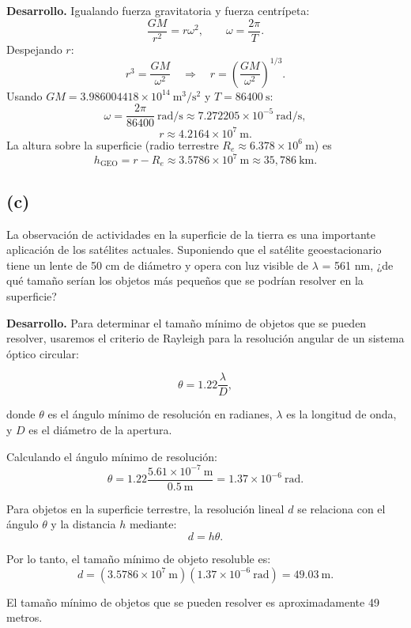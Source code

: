 \documentclass[11pt]{article}
\begin{document}
\vspace{0.5em}
\noindent\textbf{Desarrollo.} Igualando fuerza gravitatoria y fuerza centrípeta:
\[
\frac{GM}{r^2} = r\omega^2,\qquad \omega = \frac{2\pi}{T}.
\]
Despejando \(r\):
\[
r^3 = \frac{GM}{\omega^2} \quad\Rightarrow\quad r = \left(\frac{GM}{\omega^2}\right)^{1/3}.
\]
Usando \(GM = 3.986004418\times 10^{14}\ \mathrm{m^3/s^2}\) y \(T=86400\ \mathrm{s}\):
\[
\omega = \frac{2\pi}{86400}\ \mathrm{rad/s}\approx 7.272205\times 10^{-5}\ \mathrm{rad/s},
\]
\[
r \approx 4.2164\times 10^{7}\ \mathrm{m}.
\]
La altura sobre la superficie (radio terrestre \(R_e\approx 6.378\times 10^{6}\ \mathrm{m}\)) es
\[
\boxed{h_{\text{GEO}} = r - R_e \approx 3.5786\times 10^{7}\ \mathrm{m} \approx 35{,}786\ \mathrm{km}.}
\]

\subsection*{(c)}
La observación de actividades en la superficie de la tierra es una importante aplicación de los satélites actuales. Suponiendo que el satélite geoestacionario tiene un lente de 50 cm de diámetro y opera con luz visible de $\lambda$ = 561 nm, ¿de qué tamaño serían los objetos más pequeños que se podrían resolver en la superficie?

\vspace{0.5em}
\noindent\textbf{Desarrollo.}
Para determinar el tamaño mínimo de objetos que se pueden resolver, usaremos el criterio de Rayleigh para la resolución angular de un sistema óptico circular:

\[
\theta = 1.22 \frac{\lambda}{D},
\]

donde \(\theta\) es el ángulo mínimo de resolución en radianes, \(\lambda\) es la longitud de onda, y \(D\) es el diámetro de la apertura.

Calculando el ángulo mínimo de resolución:
\[
\theta = 1.22 \frac{5.61\times 10^{-7}\ \mathrm{m}}{0.5\ \mathrm{m}} = 1.37\times 10^{-6}\ \mathrm{rad}.
\]

Para objetos en la superficie terrestre, la resolución lineal \(d\) se relaciona con el ángulo \(\theta\) y la distancia \(h\) mediante:
\[
d = h\theta.
\]

Por lo tanto, el tamaño mínimo de objeto resoluble es:
\[
d = (3.5786\times 10^7\ \mathrm{m})(1.37\times 10^{-6}\ \mathrm{rad}) = 49.03\ \mathrm{m}.
\]

El tamaño mínimo de objetos que se pueden resolver es aproximadamente 49 metros.
\end{document}
